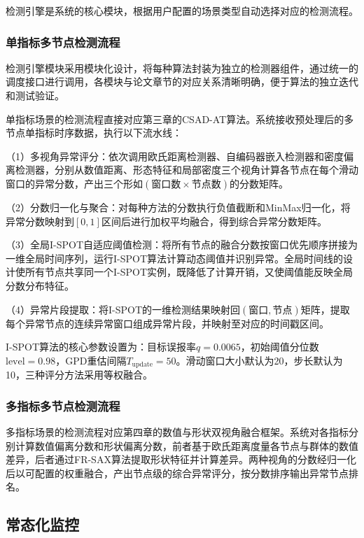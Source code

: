 检测引擎是系统的核心模块，根据用户配置的场景类型自动选择对应的检测流程。

\subsubsection{单指标多节点检测流程}

检测引擎模块采用模块化设计，将每种算法封装为独立的检测器组件，通过统一的调度接口进行调用，各模块与论文章节的对应关系清晰明确，便于算法的独立迭代和测试验证。

单指标场景的检测流程直接对应第三章的CSAD-AT算法。系统接收预处理后的多节点单指标时序数据，执行以下流水线：

（1）多视角异常评分：依次调用欧氏距离检测器、自编码器嵌入检测器和密度偏离检测器，分别从数值距离、形态特征和局部密度三个视角计算各节点在每个滑动窗口的异常分数，产出三个形如$(\text{窗口数} \times \text{节点数})$的分数矩阵。

（2）分数归一化与聚合：对每种方法的分数执行负值截断和MinMax归一化，将异常分数映射到$[0, 1]$区间后进行加权平均融合，得到综合异常分数矩阵。

（3）全局I-SPOT自适应阈值检测：将所有节点的融合分数按窗口优先顺序拼接为一维全局时间序列，运行I-SPOT算法计算动态阈值并识别异常。全局时间线的设计使所有节点共享同一个I-SPOT实例，既降低了计算开销，又使阈值能反映全局分数分布特征。

（4）异常片段提取：将I-SPOT的一维检测结果映射回$(\text{窗口}, \text{节点})$矩阵，提取每个异常节点的连续异常窗口组成异常片段，并映射至对应的时间戳区间。

I-SPOT算法的核心参数设置为：目标误报率$q = 0.0065$，初始阈值分位数$\text{level} = 0.98$，GPD重估间隔$T_{\text{update}} = 50$。滑动窗口大小默认为20，步长默认为10，三种评分方法采用等权融合。

\subsubsection{多指标多节点检测流程}

多指标场景的检测流程对应第四章的数值与形状双视角融合框架。系统对各指标分别计算数值偏离分数和形状偏离分数，前者基于欧氏距离度量各节点与群体的数值差异，后者通过FR-SAX算法提取形状特征并计算差异。两种视角的分数经归一化后以可配置的权重融合，产出节点级的综合异常评分，按分数排序输出异常节点排名。

\subsection{常态化监控}

